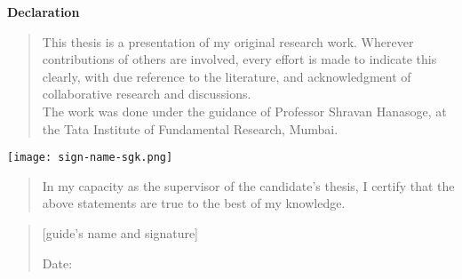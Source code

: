
\centerline{\Large\bf Declaration} \vspace{1cm}
\begin{quote}
	
	This thesis is a presentation of my original research work. Wherever contributions of others are involved, every effort is made to indicate this clearly, with due reference to the literature, and acknowledgment of collaborative research and discussions. \\
	
	
	The work was done under the guidance of Professor Shravan Hanasoge, at the Tata Institute of Fundamental Research, Mumbai.
\end{quote}

\vspace{1.5cm}
\begin{flushright}
\hspace{10cm} \texttt{[image: sign-name-sgk.png]}
\end{flushright}

\vspace{2.5cm}

\begin{quote}
	
	In my capacity as the supervisor of the candidate's thesis, I certify that the above statements are true to the best of my knowledge.
	
\end{quote}
\vspace{1.5cm}
\begin{quote}
\hspace{0cm} [guide's name and signature]

\hspace{-0.1cm}  Date:  
\end{quote}
